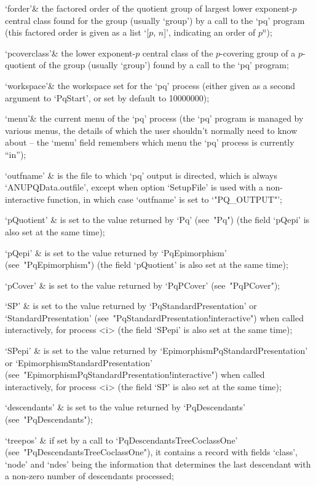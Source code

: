 \quad`forder'& the factored order of the quotient group of largest  lower
exponent-$p$ central class found for the group  (usually  `group')  by  a
call to the `pq' program (this factored order is given as  a  list  `[$p$,
$n$]', indicating an order of $p^n$);

\quad`pcoverclass'&  the  lower  exponent-$p$  central   class   of   the
$p$-covering group of a $p$-quotient of the group (usually `group') found
by a call to the `pq' program;

\quad`workspace'& the workspace set for the `pq' process (either given as
a second argument to `PqStart', or set by default to 10000000);

\quad`menu'& the current menu of the `pq' process  (the  `pq'  program  is
managed by various  menus,  the  details  of  which  the  user  shouldn't
normally need to know about -- the `menu' field remembers which menu  the
`pq' process is currently ``in'');

\quad`outfname' & is the file to which `pq' output is directed, which  is
always `ANUPQData.outfile', except when option `SetupFile' is used with a
non-interactive  function,  in  which   case   `outfname'   is   set   to
`"PQ_OUTPUT"';

\quad`pQuotient' & is set to the value returned by `Pq'  (see~"Pq")  (the
field `pQepi' is also set at the same time);

\quad`pQepi'  &  is  set  to  the  value  returned   by   `PqEpimorphism'
(see~"PqEpimorphism") (the field `pQuotient' is  also  set  at  the  same
time);

\quad`pCover'  &  is  set   to   the   value   returned   by   `PqPCover'
(see~"PqPCover");

\quad`SP' & is set to the value returned by  `PqStandardPresentation'  or
`StandardPresentation'  (see~"PqStandardPresentation!interactive")   when
called interactively, for process <i> (the field `SPepi' is also  set  at
the same time);

\quad`SPepi'    &    is    set    to    the     value     returned     by
`EpimorphismPqStandardPresentation' or  `EpimorphismStandardPresentation'
(see~"EpimorphismPqStandardPresentation!interactive")     when     called
interactively, for process <i> (the field `SP' is also set  at  the  same
time);

\quad`descendants' & is    set    to    the     value     returned     by
`PqDescendants' (see~"PqDescendants");

\quad`treepos' &  if  set  by  a  call  to  `PqDescendantsTreeCoclassOne'
(see~"PqDescendantsTreeCoclassOne"), it contains  a  record  with  fields
`class', `node' and `ndes' being the information that determines the last
descendant with a non-zero number of descendants processed;


